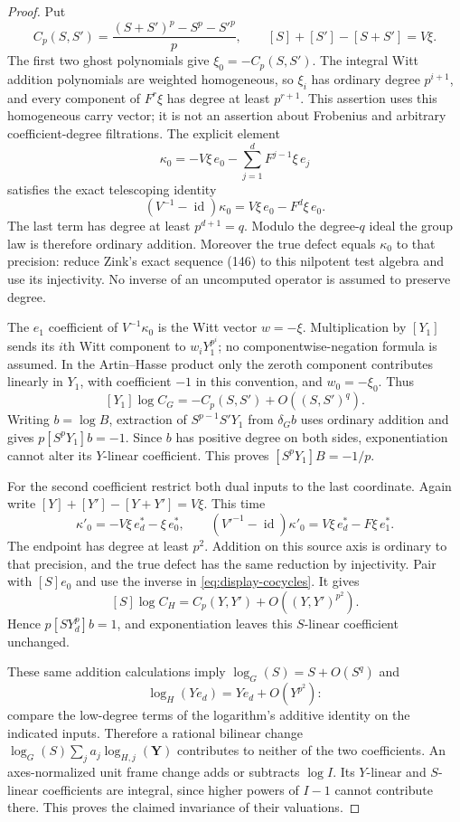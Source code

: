 \documentclass[11pt,a4paper]{article}
\theoremstyle{definition}\newtheorem{remark}[theorem]{Remark}
\newcommand{\id}{\operatorname{id}}\newcommand{\Hom}{\operatorname{Hom}}
\begin{document}
\begin{proof}
Put
\[
 C_p(S,S')=\frac{(S+S')^p-S^p-S'^p}{p},\qquad
 [S]+[S']-[S+S']=V\xi.
\]
The first two ghost polynomials give $\xi_0=-C_p(S,S')$. The integral Witt addition polynomials are weighted homogeneous, so $\xi_i$ has ordinary degree $p^{i+1}$, and every component of $F^r\xi$ has degree at least $p^{r+1}$. This assertion uses this homogeneous carry vector; it is not an assertion about Frobenius and arbitrary coefficient-degree filtrations. The explicit element
\[
 \kappa_0=-V\xi\,e_0-\sum_{j=1}^dF^{j-1}\xi\,e_j
\]
satisfies the exact telescoping identity
\[
 (V^{-1}-\id)\kappa_0=V\xi\,e_0-F^d\xi\,e_0.
\]
The last term has degree at least $p^{d+1}=q$. Modulo the degree-$q$ ideal the group law is therefore ordinary addition. Moreover the true defect equals $\kappa_0$ to that precision: reduce Zink's exact sequence (146) to this nilpotent test algebra and use its injectivity. No inverse of an uncomputed operator is assumed to preserve degree.

The $e_1$ coefficient of $V^{-1}\kappa_0$ is the Witt vector $w=-\xi$. Multiplication by $[Y_1]$ sends its $i$th Witt component to $w_iY_1^{p^i}$; no componentwise-negation formula is assumed. In the Artin--Hasse product only the zeroth component contributes linearly in $Y_1$, with coefficient $-1$ in this convention, and $w_0=-\xi_0$. Thus
\[
 [Y_1]\log C_G=-C_p(S,S')+O((S,S')^q).
\]
Writing $b=\log B$, extraction of $S^{p-1}S'Y_1$ from $\delta_G b$ uses ordinary addition and gives $p[S^pY_1]b=-1$. Since $b$ has positive degree on both sides, exponentiation cannot alter its $Y$-linear coefficient. This proves $[S^pY_1]B=-1/p$.

For the second coefficient restrict both dual inputs to the last coordinate. Again write $[Y]+[Y']-[Y+Y']=V\xi$. This time
\[
 \kappa'_0=-V\xi\,e_d^*-\xi\,e_0^*,\qquad
 (V'^{-1}-\id)\kappa'_0=V\xi\,e_d^*-F\xi\,e_1^*.
\]
The endpoint has degree at least $p^2$. Addition on this source axis is ordinary to that precision, and the true defect has the same reduction by injectivity. Pair with $[S]e_0$ and use the inverse in \eqref{eq:display-cocycles}. It gives
\[
 [S]\log C_H=C_p(Y,Y')+O((Y,Y')^{p^2}).
\]
Hence $p[SY_d^p]b=1$, and exponentiation leaves this $S$-linear coefficient unchanged.

These same addition calculations imply $\log_G(S)=S+O(S^q)$ and
\[
 \log_H(Ye_d)=Ye_d+O(Y^{p^2}):
\]
compare the low-degree terms of the logarithm's additive identity on the indicated inputs. Therefore a rational bilinear change $\log_G(S)\sum_j a_j\log_{H,j}(\mathbf Y)$ contributes to neither of the two coefficients. An axes-normalized unit frame change adds or subtracts $\log I$. Its $Y$-linear and $S$-linear coefficients are integral, since higher powers of $I-1$ cannot contribute there. This proves the claimed invariance of their valuations.


\end{proof}
\end{document}
